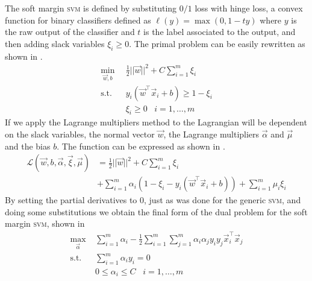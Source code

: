The soft margin \textsc{svm} is defined by substituting $0/1$ loss with hinge loss, a convex function for binary
classifiers defined as $\ell(y) = \max(0, 1 - ty)$ where $y$ is the raw output of the classifier and
$t$ is the label associated to the output, and then adding slack variables $\xi_i \geq 0$. The primal problem can be easily rewritten as shown in .
\begin{equation}
	\label{eq:sm-primal-final}
	\begin{aligned}
		\min_{\vec{w}, b} & \frac{1}{2}||\vec{w}||^2 + C\sum_{i = 1}^m \xi_i \\
		\text{s.t.} \hspace{10pt}& y_i(\vec{w}^\top\vec{x}_i + b) \geq 1 - \xi_i \\
		& \xi_i \geq 0 \hspace{10pt}i = 1, \ldots, m
	\end{aligned}
\end{equation}
If we apply the Lagrange multipliers method to  the Lagrangian will be
dependent on the slack variables, the normal vector $\vec{w}$, the Lagrange multipliers
$\vec{\alpha}$ and $\vec{\mu}$ and the bias $b$. The function can be expressed as shown in
.
\begin{equation}
	\label{eq:sm-lagrangian}
	\begin{aligned}
		\mathcal{L}(\vec{w}, b, \vec{\alpha}, \vec{\xi}, \vec{\mu}) &=
		\frac{1}{2}||\vec{w}||^2 + C\sum_{i = 1}^m \xi_i \\ 
		&+ \sum_{i = 1}^m \alpha_i(1 - \xi_i - y_i(\vec{w}^\top\vec{x}_i + b)) + \sum_{i = 1}^m\mu_i\xi_i
	\end{aligned}
\end{equation}
By setting the partial derivatives to $0$, just as was done for the generic \textsc{svm}, and doing
some substitutions we obtain the final form of the dual problem for the soft margin \textsc{svm}, shown in
\begin{equation}
	\label{eq:sm-dual-final}
	\begin{aligned}
		\max_{\vec{\alpha}} & \sum_{i = 1}^m \alpha_i - \frac{1}{2}\sum_{i = 1}^m\sum_{j =
		1}^m\alpha_i\alpha_jy_iy_j\vec{x}_i^\top\vec{x}_j \\
		\text{s.t.} \hspace{10pt} & \sum_{i = 1}^m\alpha_iy_i = 0 \\
		& 0 \leq \alpha_i \leq C \hspace{10pt} i = 1, \ldots, m
	\end{aligned}
\end{equation}

